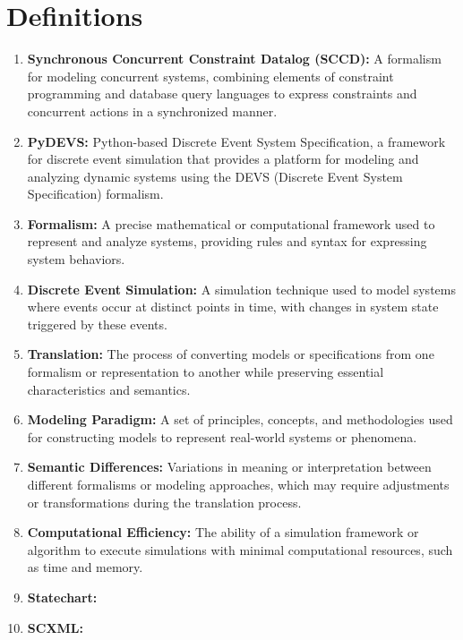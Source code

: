 \section{Definitions}
\begin{enumerate}
    \item \textbf{Synchronous Concurrent Constraint Datalog (SCCD):} A formalism for modeling concurrent systems, combining elements of constraint programming and database query languages to express constraints and concurrent actions in a synchronized manner.
    
    \item \textbf{PyDEVS:} Python-based Discrete Event System Specification, a framework for discrete event simulation that provides a platform for modeling and analyzing dynamic systems using the DEVS (Discrete Event System Specification) formalism.
    
    \item \textbf{Formalism:} A precise mathematical or computational framework used to represent and analyze systems, providing rules and syntax for expressing system behaviors.
        
    \item \textbf{Discrete Event Simulation:} A simulation technique used to model systems where events occur at distinct points in time, with changes in system state triggered by these events.
    
    \item \textbf{Translation:} The process of converting models or specifications from one formalism or representation to another while preserving essential characteristics and semantics.
    
    \item \textbf{Modeling Paradigm:} A set of principles, concepts, and methodologies used for constructing models to represent real-world systems or phenomena.
    
    \item \textbf{Semantic Differences:} Variations in meaning or interpretation between different formalisms or modeling approaches, which may require adjustments or transformations during the translation process.
    
    \item \textbf{Computational Efficiency:} The ability of a simulation framework or algorithm to execute simulations with minimal computational resources, such as time and memory.
    
    \item \textbf{Statechart:}

    \item \textbf{SCXML:}
  \end{enumerate}

